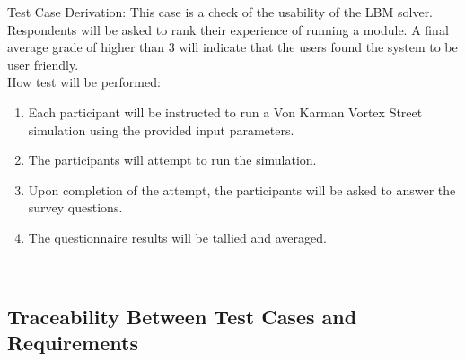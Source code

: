 \documentclass[12pt, titlepage]{article}
\begin{document}
\begin{enumerate}
Test Case Derivation: This case is a check of the usability of the LBM solver. Respondents will be asked to rank their experience of running a module. A final average grade of higher than 3 will indicate that the users found the system to be user friendly.\\
	
How test will be performed: 

\begin{enumerate}
\item Each participant will be instructed to run a Von Karman Vortex Street simulation using the provided input parameters.
\item The participants will attempt to run the simulation.
\item Upon completion of the attempt, the participants will be asked to answer the survey questions.
\item The questionnaire results will be tallied and averaged.
\end{enumerate}

\end{enumerate}

~\newpage
\subsection{Traceability Between Test Cases and Requirements}
\end{document}
